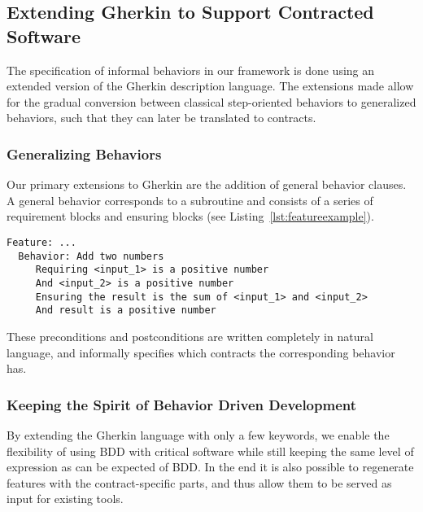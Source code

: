 \subsection{Extending Gherkin to Support Contracted Software}
\label{sub:Extending Gherkin to Support Contracted Software}

The specification of informal behaviors in our framework is done using an
extended version of the Gherkin description language.
The extensions made allow for the gradual conversion between classical step-oriented behaviors to generalized behaviors, such that they can later be translated to contracts.


\subsubsection{Generalizing Behaviors}
\label{sub:Generalizing Behaviors}

Our primary extensions to Gherkin are the addition of general
behavior clauses. A general behavior corresponds to a subroutine
and consists of a series of requirement blocks and ensuring blocks
(see Listing~\ref{lst:featureexample}).

\begin{lstlisting}[caption={General Behavior Description of Adding Natural Numbers},label={lst:featureexample}]
  Feature: ...
  Behavior: Add two numbers
     Requiring <input_1> is a positive number
     And <input_2> is a positive number
     Ensuring the result is the sum of <input_1> and <input_2>
     And result is a positive number
\end{lstlisting}


These preconditions and postconditions are written completely in
natural language, and informally specifies which contracts the corresponding
behavior has.

\subsubsection{Keeping the Spirit of Behavior Driven Development}
\label{ssub:Keeping the Spirit of Behavior Driven Development}
By extending the Gherkin language with only a few keywords, we enable the flexibility of using BDD with critical software
while still keeping the same level of expression as can be expected of BDD. In the end it is also possible to regenerate features with
the contract-specific parts, and thus allow them to be served as input for existing tools.


